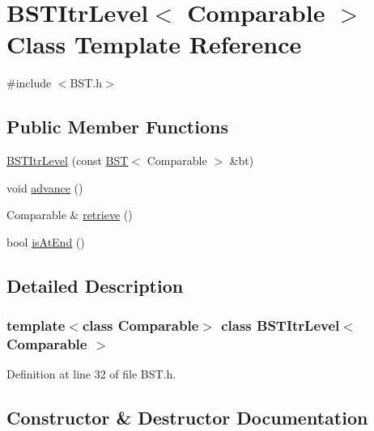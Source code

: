 \hypertarget{class_b_s_t_itr_level}{}\section{B\+S\+T\+Itr\+Level$<$ Comparable $>$ Class Template Reference}
\label{class_b_s_t_itr_level}


{\ttfamily \#include $<$B\+S\+T.\+h$>$}

\subsection*{Public Member Functions}
\begin{DoxyCompactItemize}
\item 
\hyperlink{class_b_s_t_itr_level_a8fd5cdde93eb182c4cd5cf6b2c5efaeb}{B\+S\+T\+Itr\+Level} (const \hyperlink{class_b_s_t}{B\+ST}$<$ Comparable $>$ \&bt)
\item 
void \hyperlink{class_b_s_t_itr_level_ad54a6fa289a59d6050b507abe40d463b}{advance} ()
\item 
Comparable \& \hyperlink{class_b_s_t_itr_level_a0340bd9f21f72ae25348f383e67e7f91}{retrieve} ()
\item 
bool \hyperlink{class_b_s_t_itr_level_a89bc8e81dde255fd6bad917cacc0d489}{is\+At\+End} ()
\end{DoxyCompactItemize}


\subsection{Detailed Description}
\subsubsection*{template$<$class Comparable$>$\newline
class B\+S\+T\+Itr\+Level$<$ Comparable $>$}



Definition at line 32 of file B\+S\+T.\+h.



\subsection{Constructor \& Destructor Documentation}
\hypertarget{class_b_s_t_itr_level_a8fd5cdde93eb182c4cd5cf6b2c5efaeb}{}\label{class_b_s_t_itr_level_a8fd5cdde93eb182c4cd5cf6b2c5efaeb} 
